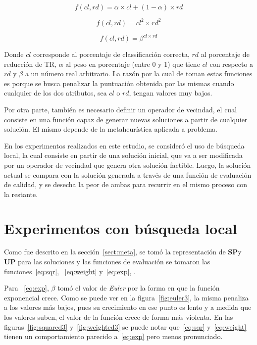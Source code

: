 \documentclass{ci5652}
\begin{document}
\begin{equation}\label{eq:weight}
f(cl,rd) = \alpha\times cl + (1 - \alpha)\times rd
\end{equation}

\begin{equation}\label{eq:sqr}
f(cl,rd) = cl^{2}\times rd^{2}
\end{equation}

\begin{equation}\label{eq:exp}
f(cl,rd) = \beta^{cl\times rd}
\end{equation}

Donde $cl$ corresponde al porcentaje de classificación correcta, $rd$ al porcentaje de reducción de TR, $\alpha$ al peso en porcentaje (entre 0 y 1) que tiene $cl$ con respecto a $rd$ y $\beta$ a un número real arbitrario. La razón por la cual de toman estas funciones es porque se busca penalizar la puntuación obtenida por las mismas cuando cualquier de los dos atributos, sea $cl$ o $rd$, tengan valores muy bajos.

Por otra parte, también es necesario definir un operador de vecindad, el cual consiste en una función capaz de generar nuevas soluciones a partir de cualquier solución. El mismo depende de la metaheurística aplicada a problema.

En los experimentos realizados en este estudio, se consideró el uso de búsqueda local, la cual consiste en partir de una solución inicial, que va a ser modificada por un operador de vecindad que genera otra solución factible. Luego, la solución actual se compara con la solución generada a través de una función de evaluación de calidad, y se desecha la peor de ambas para recurrir en el mismo proceso con la restante.


\section{Experimentos con búsqueda local}

Como fue descrito en la sección~\ref{sect:meta}, se tomó la representación de \textbf{SP}y \textbf{UP} para las soluciones y las funciones de evaluación se tomaron las funciones~\ref{eq:sqr}, ~\ref{eq:weight} y~\ref{eq:exp}, .

Para ~\ref{eq:exp}, $\beta$ tomó el valor de \textit{Euler} por la forma en que la función exponencial crece. Como se puede ver en la figura~\ref{fig:euler3}, la misma penaliza a los valores más bajos, pues su crecimiento en ese punto es lento y a medida que los valores suben, el valor de la función crece de forma más violenta. En las figuras~\ref{fig:squared3} y~\ref{fig:weighted3} se puede notar que~\ref{eq:sqr} y~\ref{eq:weight} tienen un comportamiento parecido a~\ref{eq:exp} pero menos pronunciado. 
\end{document}
